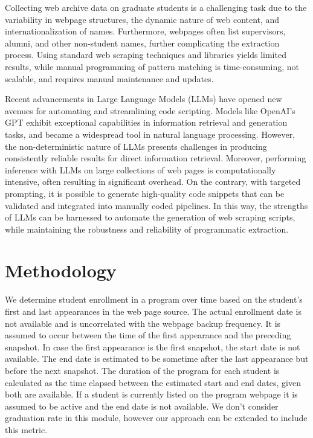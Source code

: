 \documentclass[11pt]{article}
\begin{document}
Collecting web archive data on graduate students is a challenging task due to the variability in webpage structures, the dynamic nature of web content, and internationalization of names.
Furthermore, webpages often list supervisors, alumni, and other non-student names, further complicating the extraction process.
Using standard web scraping techniques and libraries yields limited results, while manual programming of pattern matching is time-consuming, not scalable, and requires manual maintenance and updates.

Recent advancements in Large Language Models (LLMs) have opened new avenues for automating and streamlining code scripting.
Models like OpenAI's GPT exhibit exceptional capabilities in information retrieval and generation tasks, and became a widespread tool in natural language processing.
However, the non-deterministic nature of LLMs presents challenges in producing consistently reliable results for direct information retrieval.
Moreover, performing inference with LLMs on large collections of web pages is computationally intensive, often resulting in significant overhead.
On the contrary, with targeted prompting, it is possible to generate high-quality code snippets that can be validated and integrated into manually coded pipelines.
In this way, the strengths of LLMs can be harnessed to automate the generation of web scraping scripts, while maintaining the robustness and reliability of programmatic extraction.

\section{Methodology}

We determine student enrollment in a program over time based on the student’s first and last appearances in the web page source.
The actual enrollment date is not available and is uncorrelated with the webpage backup frequency.
It is assumed to occur between the time of the first appearance and the preceding snapshot.
In case the first appearance is the first snapshot, the start date is not available.
The end date is estimated to be sometime after the last appearance but before the next snapshot.
The duration of the program for each student is calculated as the time elapsed between the estimated start and end dates, given both are available.
If a student is currently listed on the program webpage it is assumed to be active and the end date is not available.
We don't consider graduation rate in this module, however our approach can be extended to include this metric.
\end{document}
